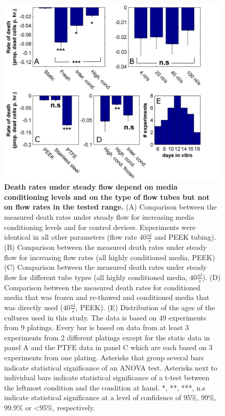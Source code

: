     \begin{figure}[!htb]
            \centering
            \includegraphics[width=15cm]{chapter4/figures/viabilityStats/viabilityStats.jpg}
            \caption[Statistics of death rates for various steady flow conditions]{\textbf{Death rates under steady flow depend on media conditioning levels and on the type of flow tubes but not on flow rates in the tested range.} (A) Comparison between the measured death rates under steady flow for increasing media conditioning levels and for control devices. Experiments were identical in all other parameters (flow rate \(40 \frac{nl}{s}\) and PEEK tubing). (B) Comparison between the measured death rates under steady flow for increasing flow rates (all highly conditioned media, PEEK) (C)  Comparison between the measured death rates under steady flow for different tube types (all highly conditioned media, \(40 \frac{nl}{s}\)). (D) Comparison between the measured death rates for conditioned media that was frozen and re-thawed and conditioned media that was directly used (\(40 \frac{nl}{s}\), PEEK). (E) Distribution of the ages of the cultures used in this study. The data is based on 49 experiments from 9 platings. Every bar is based on data from at least 3 experiments from 2 different platings except for the static data in panel A and the PTFE data in panel C which are each based on 3 experiments from one plating. Asterisks that group several bars indicate statistical significance of an ANOVA test. Asterisks next to individual bars indicate statistical significance of a t-test between the leftmost condition and the condition at hand. *, **, ***, n.s indicate statistical significance at a level of confidence of 95\%, 99\%, 99.9\% or \textless95\%, respectively.}
            \label{fig:devices:viabilityStats}

    \end{figure}


